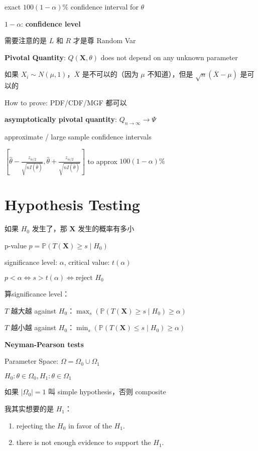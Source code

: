 \documentclass[9pt,landscape]{article}
\begin{document}
\begin{multicols}{3}
exact $100(1-\alpha)\%$ confidence interval for $\theta$

$1-\alpha$: \textbf{confidence level}

需要注意的是 $L$ 和 $R$ 才是尊 Random Var

\textbf{Pivotal Quantity}: $Q(\boldsymbol{X}, \theta)$ does not depend on any unknown parameter

如果 $X_i\sim N(\mu, 1)$，$\overline{X}$ 是不可以的（因为 $\mu$ 不知道），但是 $\sqrt{n}(\overline{X}-\mu)$ 是可以的

How to prove: PDF/CDF/MGF 都可以

\textbf{asymptotically pivotal quantity}: $Q_{n\to\infty}\to\Psi$

approximate / large sample confidence intervals

$\left[\hat{\theta}-\frac{z_{\alpha/2}}{\sqrt{nI(\hat{\theta})}}, \hat{\theta}+\frac{z_{\alpha/2}}{\sqrt{nI(\hat{\theta})}}\right]$ to approx $100(1-\alpha)\%$

\section{Hypothesis Testing}

如果 $H_0$ 发生了，那 $\boldsymbol{X}$ 发生的概率有多小

p-value $p=\mathbb{P}(T(\boldsymbol{X})\ge s\mid H_0)$

significance level: $\alpha$, critical value: $t(\alpha)$

$p<\alpha\Leftrightarrow s>t(\alpha)\Leftrightarrow\text{reject } H_0$

算significance level：

$T$ 越大越 against $H_0$：$\max_s(\mathbb{P}(T(\boldsymbol{X})\ge s\mid H_0)\ge\alpha)$

$T$ 越小越 against $H_0$：$\min_s(\mathbb{P}(T(\boldsymbol{X})\le s\mid H_0)\ge\alpha)$

\textbf{Neyman-Pearson tests}

Parameter Space: $\Omega=\Omega_0\cup\Omega_1$

$H_0: \theta\in\Omega_0, H_1: \theta\in\Omega_1$

如果 $|\Omega_0|=1$ 叫 simple hypothesis，否则 composite

我其实想要的是 $H_1$：
\begin{enumerate}
	\item rejecting the $H_0$ in favor of the $H_1$.
	\item there is not enough evidence to support the $H_1$.
\end{enumerate}


\end{multicols}
\end{document}
